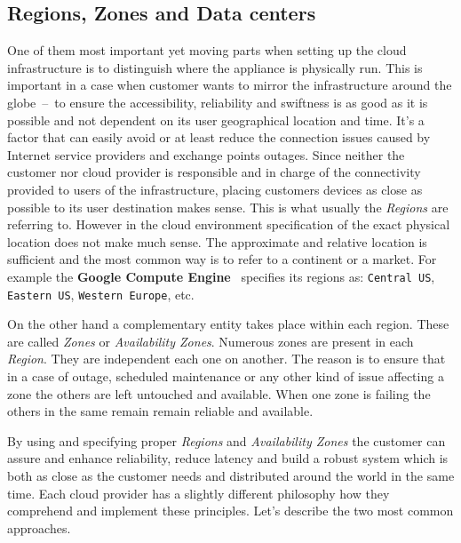 \subsection{Regions, Zones and Data centers}
\label{sub:Regions, Zones and Data centers}

One of them most important yet moving parts when setting up the cloud infrastructure is to distinguish where the appliance is physically run. This is important in a case when customer wants to mirror the infrastructure around the globe \,--\, to ensure the accessibility, reliability and swiftness is as good as it is possible and not dependent on its user geographical location and time. It's a factor that can easily avoid or at least reduce the connection issues caused by Internet service providers and exchange points outages. Since neither the customer nor cloud provider is responsible and in charge of the connectivity provided to users of the infrastructure, placing customers devices as close as possible to its user destination makes sense. This is what usually the \emph{Regions} are referring to. However in the cloud environment specification of the exact physical location does not make much sense. The approximate and relative location is sufficient and the most common way is to refer to a continent or a market. For example the \textbf{Google Compute Engine}~\cite{gce} specifies its regions as: \texttt{Central US}, \texttt{Eastern US}, \texttt{Western Europe}, etc.

On the other hand a complementary entity takes place within each region. These are called \emph{Zones} or \emph{Availability Zones}. Numerous zones are present in each \emph{Region}. They are independent each one on another. The reason is to ensure that in a case of outage, scheduled maintenance or any other kind of issue affecting a zone the others are left untouched and available. When one zone is failing the others in the same remain remain reliable and available.

By using and specifying proper \emph{Regions} and \emph{Availability Zones} the customer can assure and enhance reliability, reduce latency and build a robust system which is both as close as the customer needs and distributed around the world in the same time. Each cloud provider has a slightly different philosophy how they comprehend and implement these principles. Let's describe the two most common approaches.

